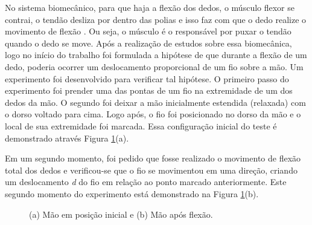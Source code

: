 \documentclass[
	12pt,				%
	openright,			%
	oneside,			%
	a4paper,			%
	english,			%
	brazil				%
	]{abntex2}
\begin{document}
		No sistema biomecânico, para que haja a flexão dos dedos, o músculo flexor se contrai, o tendão desliza por dentro das polias e isso faz com que o dedo realize o movimento de flexão \cite{drricardocirurgiao}. Ou seja, o músculo é o responsável por puxar o tendão quando o dedo se move. Após a realização de estudos sobre essa biomecânica, logo no início do trabalho foi formulada a hipótese de que durante a flexão de um dedo, poderia ocorrer um deslocamento proporcional de um fio sobre a mão. Um experimento foi desenvolvido para verificar tal hipótese. O primeiro passo do experimento foi prender uma das pontas de um fio na extremidade de um dos dedos da mão. O segundo foi deixar a mão inicialmente estendida (relaxada) com o dorso voltado para cima. Logo após, o fio foi posicionado no dorso da mão e o local de sua extremidade foi marcada. Essa configuração inicial do teste é demonstrado através Figura \ref{Fig:hand-wire-steady-and-flex}(a).

			Em um segundo momento, foi pedido que fosse realizado o movimento de flexão total dos dedos e verificou-se que o fio se movimentou em uma direção, criando um deslocamento \textit{d} do fio em relação ao ponto marcado anteriormente. Este segundo momento do experimento está demonstrado na Figura \ref{Fig:hand-wire-steady-and-flex}(b).
		

 

\begin{figure}[!htb]
   \centering
   \caption{ (a) Mão em posição inicial e (b) Mão após flexão.}
   \centering
   \label{Fig:hand-wire-steady-and-flex}
 \end{figure}
\end{document}
